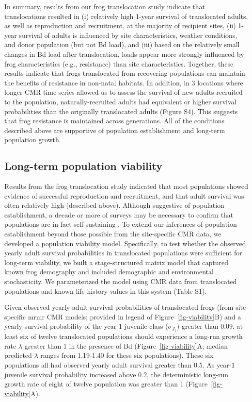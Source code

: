 \documentclass[9pt,twocolumn,twoside,lineno]{pnas-new}
\begin{document}
In summary, results from our frog translocation study indicate that
translocations resulted in (i) relatively high 1-year survival of
translocated adults, as well as reproduction and recruitment, at the
majority of recipient sites, (ii) 1-year survival of adults is
influenced by site characteristics, weather conditions, and donor
population (but not Bd load), and (iii) based on the relatively small
changes in Bd load after translocation, loads appear more strongly
influenced by frog characteristics (e.g., resistance) than site
characteristics. Together, these results indicate that frogs
translocated from recovering populations can maintain the benefits of
resistance in non-natal habitats. In addition, in 3 locations where
longer CMR time series allowed us to assess the survival of new adults
recruited to the population, naturally-recruited adults had equivalent
or higher survival probabilities than the originally translocated adults
(Figure S4). This suggests that frog
resistance is maintained across generations. All of the conditions
described above are supportive of population establishment and long-term
population growth.

\subsection*{Long-term population viability}

Results from the frog translocation study indicated that most
populations showed evidence of successful reproduction and recruitment,
and that adult survival was often relatively high (described above).
Although suggestive of population establishment, a decade or more of
surveys may be necessary to confirm that populations are in fact
self-sustaining \citep{joseph2018}. To extend our inferences of
population establishment beyond those possible from the site-specific
CMR data, we developed a population viability model. Specifically, to
test whether the observed yearly adult survival probabilities in
translocated populations were sufficient for long-term viability, we
built a stage-structured matrix model that captured known frog
demography and included demographic and environmental stochasticity. We
parameterized the model using CMR data from translocated populations and
known life history values in this system (Table S1).

Given observed yearly adult survival probabilities of translocated frogs
(from site-specific mrmr CMR models; provided in legend of
Figure~\ref{fig-viability}B) and a yearly survival probability of the
year-1 juvenile class (\(\sigma_{J_1}\)) greater than 0.09, at least six
of twelve translocated populations should experience a long-run growth
rate \(\lambda\) greater than 1 in the presence of Bd
(Figure~\ref{fig-viability}A; median predicted \(\lambda\) ranges from
1.19-1.40 for these six populations). These six populations all had
observed yearly adult survival greater than 0.5. As year-1 juvenile
survival probability increased above 0.2, the deterministic long-run
growth rate of eight of twelve population was greater than 1
(Figure~\ref{fig-viability}A).
\end{document}
